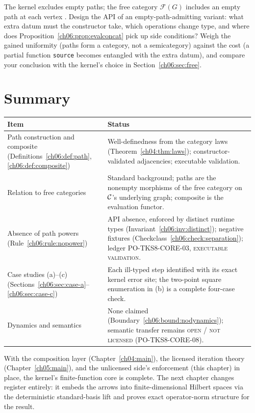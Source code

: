 \begin{exercise}
\label{ch06:ex:emptypath}
The kernel excludes empty paths; the free category $\mathcal{F}(G)$
includes an empty path at each vertex \cite{maclanecwm}. Design the API
of an empty-path-admitting variant: what extra datum must the constructor
take, which operations change type, and where does
Proposition~\ref{ch06:prop:evalconcat} pick up side conditions? Weigh the
gained uniformity (paths form a category, not a semicategory) against the
cost (a partial function \texttt{source} becomes entangled with the extra
datum), and compare your conclusion with the kernel's choice in
Section~\ref{ch06:sec:free}.
\end{exercise}

\section{Summary}
\label{ch06:sec:summary}

\begin{center}
\small
\begin{tabular}{@{}p{5.6cm}p{7.2cm}@{}}
\toprule
Item & Status \\
\midrule
Path construction and composite
(Definitions~\ref{ch06:def:path}, \ref{ch06:def:composite}) &
Well-definedness from the category laws
(Theorem~\ref{ch04:thm:laws}); constructor-validated adjacencies;
executable validation. \\
Relation to free categories \cite{maclanecwm} &
Standard background; paths are the nonempty morphisms of the free category
on $\mathcal{C}$'s underlying graph; composite is the evaluation functor. \\
Absence of path powers (Rule~\ref{ch06:rule:nopower}) &
API absence, enforced by distinct runtime types
(Invariant~\ref{ch06:inv:distinct}); negative fixtures
(Checkclass~\ref{ch06:check:separation}); ledger PO-TKS8-CORE-03,
\textsc{executable validation}. \\
Case studies (a)--(c)
(Sections~\ref{ch06:sec:case-a}--\ref{ch06:sec:case-c}) &
Each ill-typed step identified with its exact kernel error site; the
two-point square enumeration in (b) is a complete four-case check. \\
Dynamics and semantics &
None claimed (Boundary~\ref{ch06:bound:nodynamics}); semantic transfer
remains \textsc{open / not licensed} (PO-TKS8-CORE-08). \\
\bottomrule
\end{tabular}
\end{center}

With the composition layer (Chapter~\ref{ch04:main}), the licensed
iteration theory (Chapter~\ref{ch05:main}), and the unlicensed side's
enforcement (this chapter) in place, the kernel's finite-function core is
complete. The next chapter changes register entirely: it embeds the arrows
into finite-dimensional Hilbert spaces via the deterministic standard-basis
lift and proves exact operator-norm structure for the result.
